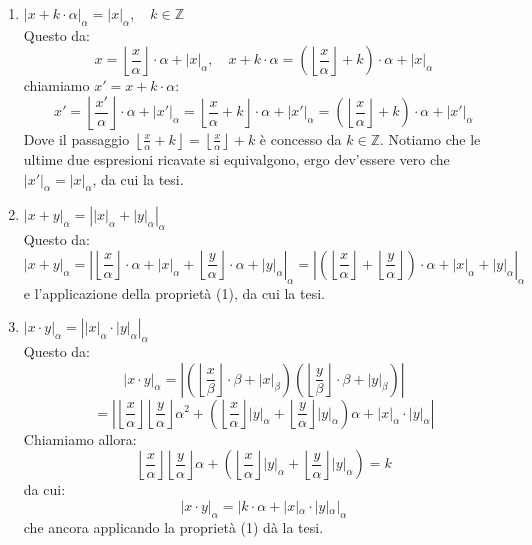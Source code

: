 \documentclass[a4paper,11pt]{article}
\begin{document}
\begin{enumerate}
	\item $| x + k \cdot \alpha |_\alpha = |x|_\alpha, \quad k \in \mathbb{Z} $ \\
	Questo da:
	$$
	x = \left\lfloor \frac{x}{\alpha} \right\rfloor \cdot \alpha + |x|_\alpha, \quad x + k \cdot \alpha = \left( \left\lfloor \frac{x}{\alpha} \right\rfloor  + k \right) \cdot \alpha + |x|_\alpha
	$$
	chiamiamo $x' = x + k \cdot \alpha$:
	$$
	x' = \left\lfloor \frac{x'}{\alpha} \right\rfloor \cdot \alpha + |x'|_\alpha = \left\lfloor \frac{x}{\alpha} + k \right\rfloor \cdot \alpha + |x'|_\alpha = \left( \left\lfloor \frac{x}{\alpha}  \right\rfloor + k \right) \cdot \alpha + |x'|_\alpha
	$$
	Dove il passaggio $\left\lfloor \frac{x}{\alpha} + k \right\rfloor = \left\lfloor \frac{x}{\alpha}  \right\rfloor + k $ è concesso da $ k \in \mathbb{Z}$.
	Notiamo che le ultime due espresioni ricavate si equivalgono, ergo dev'essere vero che $|x'|_\alpha = |x|_\alpha$, da cui la tesi.

\item $ |x  + y|_\alpha = \left| |x|_\alpha + |y|_\alpha \right|_\alpha $ \\ 
	Questo da:
	$$ 
	| x + y |_\alpha = \left| \left\lfloor \frac{x}{\alpha} \right\rfloor \cdot \alpha + |x|_\alpha + \left\lfloor \frac{y}{\alpha} \right\rfloor \cdot \alpha + |y|_\alpha \right|_\alpha = \left| \left( \left\lfloor \frac{x}{\alpha} \right\rfloor + \left\lfloor \frac{y}{\alpha} \right\rfloor \right) \cdot \alpha +  |x|_\alpha + |y|_\alpha \right|_\alpha 
	$$
	e l'applicazione della proprietà (1), da cui la tesi.

\item $ | x \cdot y |_\alpha = \left| |x|_\alpha \cdot |y|_\alpha \right|_\alpha $ \\ 
	Questo da:
	$$
| x \cdot y |_\alpha = \left| \left( \left\lfloor \frac{x}{\beta} \right\rfloor \cdot \beta + |x|_\beta \right) \left( \left\lfloor \frac{y}{\beta} \right\rfloor \cdot \beta + |y|_\beta \right)\right| 
	$$
	$$
 = \left| \left\lfloor \frac{x}{\alpha} \right\rfloor \left\lfloor \frac{y}{\alpha} \right\rfloor \alpha^2 + \left( \left\lfloor \frac{x}{\alpha} \right\rfloor |y|_\alpha +  \left\lfloor \frac{y}{\alpha} \right\rfloor |y|_\alpha\right) \alpha + |x|_\alpha \cdot |y|_\alpha \right| 
	$$
	Chiamiamo allora: 
	$$
	\left\lfloor \frac{x}{\alpha} \right\rfloor \left\lfloor \frac{y}{\alpha} \right\rfloor \alpha + \left( \left\lfloor \frac{x}{\alpha} \right\rfloor |y|_\alpha +  \left\lfloor \frac{y}{\alpha} \right\rfloor |y|_\alpha\right) = k
	$$
	da cui:
	$$
	|x \cdot y|_\alpha = | k \cdot \alpha + |x|_\alpha \cdot |y|_\alpha |_\alpha
	$$
	che ancora applicando la proprietà (1) dà la tesi.
\end{enumerate}
\end{document}
